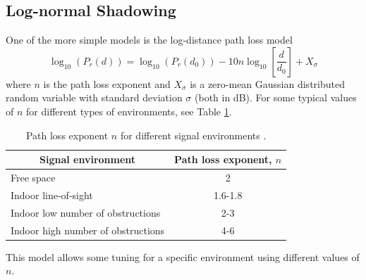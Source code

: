 \documentclass{LTHthesis}
\begin{document}
\subsection{Log-normal Shadowing} 
One of the more simple models is the log-distance path loss model
%
\begin{equation}
\log_{10}({P_r(d)})=\log_{10}({P_r(d_0)})-10n\log_{10}\left[{\frac{d}{d_0}}\right] + X_\sigma
\end{equation} 
%
where $n$ is the path loss exponent and  $X_\sigma$ is a zero-mean Gaussian distributed random variable with standard deviation $\sigma$ (both in dB). For some typical values of $n$ for different types of environments, see Table \ref{table:path_loss_n}.
%
\begin{table}
\begin{center}
\begin{tabular}{| l | c |}
\hline
\multicolumn{1}{|c|}{Signal environment} & Path loss exponent, $n$ \\
\hline
\hline
Free space & 2 \\
\hline
Indoor line-of-sight & 1.6-1.8 \\
\hline
Indoor low number of obstructions & 2-3 \\
\hline
Indoor high number of obstructions & 4-6 \\
\hline
\end{tabular}
\end{center}
\caption{Path loss exponent $n$ for different signal environments \cite{rappaport96}.}
\label{table:path_loss_n}
\end{table}
%
This model allows some tuning for a specific environment using different values of $n$.
\end{document}

